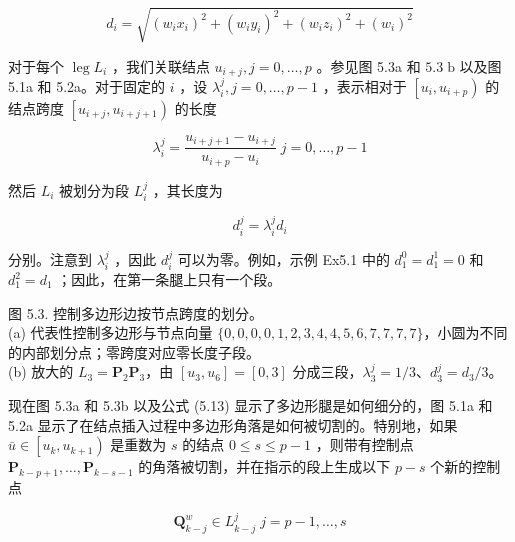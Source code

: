 \documentclass[../main.tex]{subfiles}
\begin{document}
\[
{d}_{i} = \sqrt{{\left( {w}_{i}{x}_{i}\right) }^{2} + {\left( {w}_{i}{y}_{i}\right) }^{2} + {\left( {w}_{i}{z}_{i}\right) }^{2} + {\left( {w}_{i}\right) }^{2}}
\]

对于每个 \(\operatorname{leg}{L}_{i}\) ，我们关联结点 \({u}_{i + j},j = 0,\ldots ,p\) 。参见图 5.3a 和 \({5.3}\mathrm{\;b}\) 以及图 5.1a 和 5.2a。对于固定的 \(i\) ，设 \({\lambda }_{i}^{j},j = 0,\ldots ,p - 1\) ，表示相对于 \(\left\lbrack  {{u}_{i},{u}_{i + p}}\right)\) 的结点跨度 \(\left\lbrack  {{u}_{i + j},{u}_{i + j + 1}}\right)\) 的长度

\[
{\lambda }_{i}^{j} = \frac{{u}_{i + j + 1} - {u}_{i + j}}{{u}_{i + p} - {u}_{i}}\;j = 0,\ldots ,p - 1 \tag{5.12}
\]

然后 \({L}_{i}\) 被划分为段 \({L}_{i}^{j}\) ，其长度为

\[
{d}_{i}^{j} = {\lambda }_{i}^{j}{d}_{i} \tag{5.13}
\]

分别。注意到 \({\lambda }_{i}^{j}\) ，因此 \({d}_{i}^{j}\) 可以为零。例如，示例 Ex5.1 中的 \({d}_{1}^{0} = {d}_{1}^{1} = 0\) 和 \({d}_{1}^{2} = {d}_{1}\) ；因此，在第一条腿上只有一个段。

\begin{center}
\begin{minipage}{18cm}
\vspace*{.6\baselineskip}
\centering
{}
\par\medskip
{}
\par\smallskip
图 5.3. 控制多边形边按节点跨度的划分。\\ (a) 代表性控制多边形与节点向量 \(\{0,0,0,0,1,2,3,4,4,5,6,7,7,7,7\}\)，小圆为不同的内部划分点；零跨度对应零长度子段。\\ (b) 放大的 \(L_3=\mathbf P_2\mathbf P_3\)，由 \([u_3,u_6]=[0,3]\) 分成三段，\(\lambda_3^j=1/3\)、\(d_3^j=d_3/3\)。
\end{minipage}
\end{center}

现在图 5.3a 和 5.3b 以及公式 (5.13) 显示了多边形腿是如何细分的，图 5.1a 和 5.2a 显示了在结点插入过程中多边形角落是如何被切割的。特别地，如果 \(\bar{u} \in  \left\lbrack  {{u}_{k},{u}_{k + 1}}\right)\) 是重数为 \(s\) 的结点 \(0 \leq  s \leq  p - 1\) ，则带有控制点 \({\mathbf{P}}_{k - p + 1},\ldots ,{\mathbf{P}}_{k - s - 1}\) 的角落被切割，并在指示的段上生成以下 \(p - s\) 个新的控制点

\[
{\mathbf{Q}}_{k - j}^{w} \in  {L}_{k - j}^{j}\;j = p - 1,\ldots ,s \tag{5.14}
\]
\end{document}
